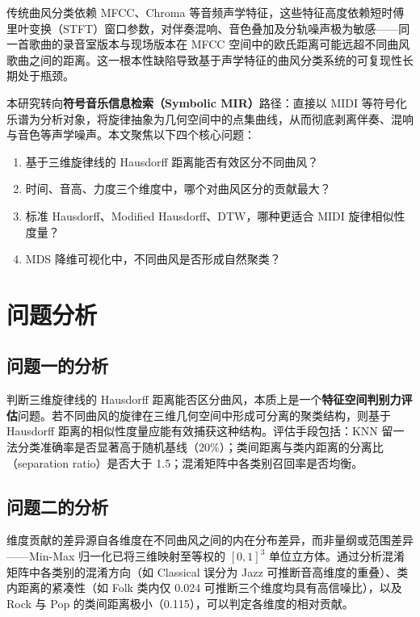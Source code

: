 \documentclass[withoutpreface]{cumcmthesis}
\begin{document}
传统曲风分类依赖 MFCC、Chroma 等音频声学特征，这些特征高度依赖短时傅里叶变换（STFT）窗口参数，对伴奏混响、音色叠加及分轨噪声极为敏感——同一首歌曲的录音室版本与现场版本在 MFCC 空间中的欧氏距离可能远超不同曲风歌曲之间的距离。这一根本性缺陷导致基于声学特征的曲风分类系统的可复现性长期处于瓶颈。

本研究转向\textbf{符号音乐信息检索（Symbolic MIR）}路径：直接以 MIDI 等符号化乐谱为分析对象，将旋律抽象为几何空间中的点集曲线，从而彻底剥离伴奏、混响与音色等声学噪声。本文聚焦以下四个核心问题：

\begin{enumerate}[label=(\arabic*),leftmargin=2em]
    \item 基于三维旋律线的 Hausdorff 距离能否有效区分不同曲风？
    \item 时间、音高、力度三个维度中，哪个对曲风区分的贡献最大？
    \item 标准 Hausdorff、Modified Hausdorff、DTW，哪种更适合 MIDI 旋律相似性度量？
    \item MDS 降维可视化中，不同曲风是否形成自然聚类？
\end{enumerate}

\section{问题分析}

\subsection{问题一的分析}

判断三维旋律线的 Hausdorff 距离能否区分曲风，本质上是一个\textbf{特征空间判别力评估}问题。若不同曲风的旋律在三维几何空间中形成可分离的聚类结构，则基于 Hausdorff 距离的相似性度量应能有效捕获这种结构。评估手段包括：KNN 留一法分类准确率是否显著高于随机基线（20\%）；类间距离与类内距离的分离比（separation ratio）是否大于 1.5；混淆矩阵中各类别召回率是否均衡。

\subsection{问题二的分析}

维度贡献的差异源自各维度在不同曲风之间的内在分布差异，而非量纲或范围差异——Min-Max 归一化已将三维映射至等权的 $[0,1]^3$ 单位立方体。通过分析混淆矩阵中各类别的混淆方向（如 Classical 误分为 Jazz 可推断音高维度的重叠）、类内距离的紧凑性（如 Folk 类内仅 0.024 可推断三个维度均具有高信噪比），以及 Rock 与 Pop 的类间距离极小（0.115），可以判定各维度的相对贡献。
\end{document}
